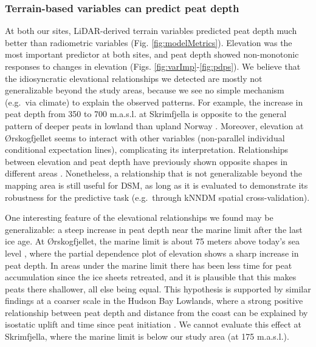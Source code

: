\documentclass[soil, manuscript]{copernicus}
\begin{document}
\subsubsection{Terrain-based variables can predict peat depth}

At both our sites, LiDAR-derived terrain variables predicted peat depth much better than radiometric variables (Fig. \ref{fig:modelMetrics}).
Elevation was the most important predictor at both sites, and peat depth showed non-monotonic responses to changes in elevation (Figs. \ref{fig:varImp}-\ref{fig:pdps}).
We believe that the idiosyncratic elevational relationships we detected are mostly not generalizable beyond the study areas, because we see no simple mechanism (e.g.~via climate) to explain the observed patterns.
For example, the increase in peat depth from 350 to 700 m.a.s.l. at Skrimfjella is opposite to the general pattern of deeper peats in lowland than upland Norway \citep{lyngstadBeskrivelserAvTorvmassivenheter2023}.
Moreover, elevation at Ørskogfjellet seems to interact with other variables (non-parallel individual conditional expectation lines), complicating its interpretation.
Relationships between elevation and peat depth have previously shown opposite shapes in different areas \citep{finlaysonEstimatingOrganicSurface2021}.
Nonetheless, a relationship that is not generalizable beyond the mapping area is still useful for DSM, as long as it is evaluated to demonstrate its robustness for the predictive task (e.g.~through kNNDM spatial cross-validation).

One interesting feature of the elevational relationships we found may be generalizable: a steep increase in peat depth near the marine limit after the last ice age.
At Ørskogfjellet, the marine limit is about 75 meters above today's sea level \citep[Geological Survey of Norway,][]{hogaasDatabaseRegistreringAv2012}, where the partial dependence plot of elevation shows a sharp increase in peat depth.
In areas under the marine limit there has been less time for peat accumulation since the ice sheets retreated, and it is plausible that this makes peats there shallower, all else being equal.
This hypothesis is supported by similar findings at a coarser scale in the Hudson Bay Lowlands, where a strong positive relationship between peat depth and distance from the coast can be explained by isostatic uplift and time since peat initiation \citep{liPeatDepthCarbon2025}.
We cannot evaluate this effect at Skrimfjella, where the marine limit is below our study area (at 175 m.a.s.l.).
\end{document}
